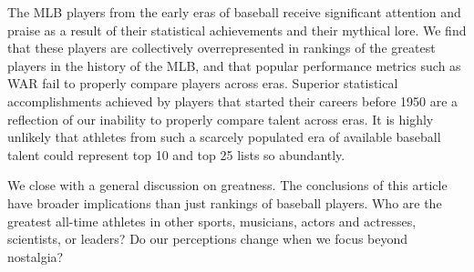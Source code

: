 \documentclass[11pt]{article}\usepackage[]{graphicx}\usepackage[]{color}
\begin{document}

The MLB players from the early eras of baseball receive significant attention 
and praise as a result of their statistical achievements and their mythical 
lore.  We find that these players are collectively overrepresented in 
rankings of the greatest players in the history of the MLB, and that popular 
performance metrics such as WAR fail to properly compare players across eras.  
Superior statistical accomplishments achieved 
by players that started their careers before 1950 are a reflection of our 
inability to properly compare talent across eras.  It is highly unlikely that 
athletes from such a scarcely populated era of available baseball talent 
could represent top 10 and top 25 lists so abundantly. 

We close with a general discussion on greatness.  The conclusions of this 
article have broader implications than just rankings of baseball players.  
Who are the greatest all-time athletes in other sports,
musicians, 
actors and actresses,
scientists, or 
leaders?  Do our perceptions change when we focus beyond nostalgia?  

\end{document}
